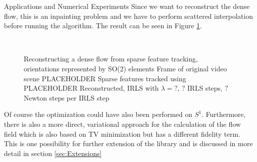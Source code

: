 \begin{chapter}{Applications and Numerical Experiments}
Since we want to reconstruct the dense flow, this is an inpainting problem and we have to perform scattered interpolation before running the algorithm. The result can be seen in 
Figure \ref{fig:application_flowfield1}.
\begin{figure}[h!]
    \centering
    \\
    \caption[Dense optical flow reconstruction]{Reconstructing a dense flow from sparse feature tracking, orientations represented by SO(2) elements
	 Frame of original video scene PLACEHOLDER
	 Sparse features tracked using PLACEHOLDER
	 Reconstructed, IRLS with $\lambda=?$, $?$ IRLS steps, $?$ Newton steps per IRLS step
	\label{fig:application_flowfield1}
    }
\end{figure}

Of course the optimization could have also been performed on $S^1$. Furthermore, there is also a more direct, variational approach for the calculation of the flow field
which is also based on TV minimization but has a different fidelity term. This is one possibility for further extension of the library and is discussed in more detail in 
section \ref{sec:Extensions}


\end{chapter}
